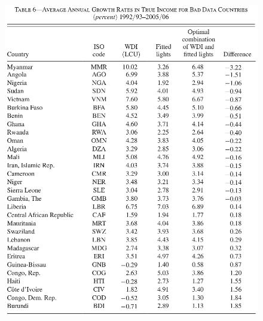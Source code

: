 \documentclass{beamer}
\begin{document}
\begin{frame}
  \begin{figure}
    \includegraphics[scale=.45]{henderson_et_al3.eps}
  \end{figure}
\end{frame}


\end{document}
